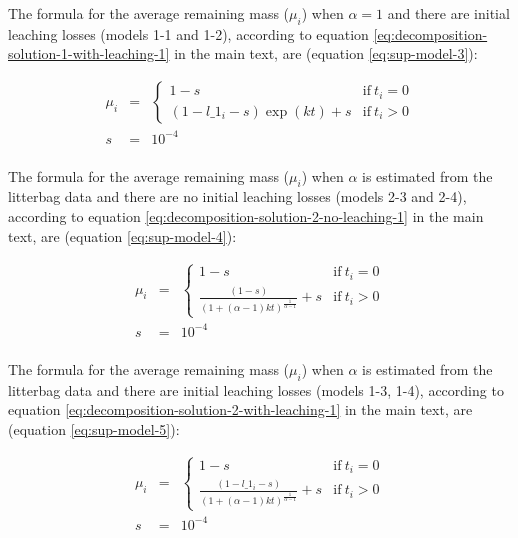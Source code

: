 \documentclass[
  12pt,
]{article}
\begin{document}
The formula for the average remaining mass (\(\mu_i\)) when \(\alpha=1\) and there are initial leaching losses (models 1-1 and 1-2), according to equation \eqref{eq:decomposition-solution-1-with-leaching-1} in the main text, are (equation \eqref{eq:sup-model-3}):

\begin{equation}
\begin{aligned}
\mu_i & = & \begin{cases} 
1 - s & \text{if}~t_i=0\\
(1 - l\_1_i - s) \exp(k t) + s & \text{if}~t_i>0
\end{cases}\\
s & = & \ensuremath{10^{-4}}\\
\label{eq:sup-model-3}
\end{aligned}
\end{equation}

The formula for the average remaining mass (\(\mu_i\)) when \(\alpha\) is estimated from the litterbag data and there are no initial leaching losses (models 2-3 and 2-4), according to equation \eqref{eq:decomposition-solution-2-no-leaching-1} in the main text, are (equation \eqref{eq:sup-model-4}):

\begin{equation}
\begin{aligned}
\mu_i & = & \begin{cases} 
1 - s & \text{if}~t_i=0\\
\frac{(1 - s)}{(1 + (\alpha - 1) k t)^{\frac{1}{\alpha - 1}}} + s & \text{if}~t_i>0
\end{cases}\\
s & = & \ensuremath{10^{-4}}\\
\label{eq:sup-model-4}
\end{aligned}
\end{equation}

The formula for the average remaining mass (\(\mu_i\)) when \(\alpha\) is estimated from the litterbag data and there are initial leaching losses (models 1-3, 1-4), according to equation \eqref{eq:decomposition-solution-2-with-leaching-1} in the main text, are (equation \eqref{eq:sup-model-5}):

\begin{equation}
\begin{aligned}
\mu_i & = & \begin{cases} 
1 - s & \text{if}~t_i=0\\
\frac{(1 - l\_1_i - s)}{(1 + (\alpha - 1) k t)^{\frac{1}{\alpha - 1}}} + s & \text{if}~t_i>0
\end{cases}\\
s & = & \ensuremath{10^{-4}}\\
\label{eq:sup-model-5}
\end{aligned}
\end{equation}
\end{document}
